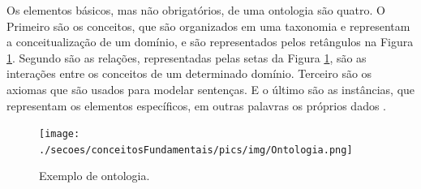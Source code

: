 Os elementos básicos, mas não obrigatórios, de uma ontologia são quatro. O Primeiro são os conceitos, que são organizados em uma taxonomia e representam a conceitualização de um domínio, e são representados pelos retângulos na Figura \ref{figura_ontologia}. Segundo são as relações, representadas pelas setas da Figura \ref{figura_ontologia}, são as interações entre os conceitos de um determinado domínio. Terceiro são os axiomas que são usados para modelar sentenças. E o último são as instâncias, que representam os elementos específicos, em outras palavras os próprios dados \cite{ALMEIDA2003}. 
\begin{figure}[!htb]
    \centering   
    \caption{Exemplo de ontologia.}
    \texttt{[image: ./secoes/conceitosFundamentais/pics/img/Ontologia.png]}
	\label{figura_ontologia}
\end{figure}

